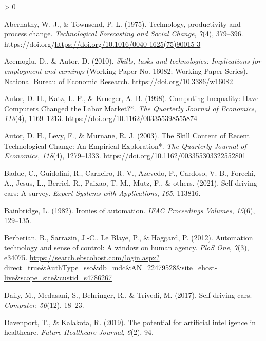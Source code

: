 \documentclass[
  english,
  man]{apa7}
\newlength{\cslhangindent}
\newenvironment{CSLReferences}[2] %
 {%
  \setlength{\parindent}{0pt}
  \ifodd #1 \everypar{\setlength{\hangindent}{\cslhangindent}}\ignorespaces\fi
  \ifnum #2 > 0
  \setlength{\parskip}{#2\baselineskip}
  \fi
 }%
 {}
\begin{document}
\hypertarget{refs}{}
\begin{CSLReferences}{1}{0}
\leavevmode\hypertarget{ref-ABERNATHY1975379}{}%
Abernathy, W. J., \& Townsend, P. L. (1975). Technology, productivity and process change. \emph{Technological Forecasting and Social Change}, \emph{7}(4), 379--396. https://doi.org/\url{https://doi.org/10.1016/0040-1625(75)90015-3}

\leavevmode\hypertarget{ref-NBERw16082}{}%
Acemoglu, D., \& Autor, D. (2010). \emph{Skills, tasks and technologies: Implications for employment and earnings} (Working Paper No. 16082; Working Paper Series). National Bureau of Economic Research. \url{https://doi.org/10.3386/w16082}

\leavevmode\hypertarget{ref-10.1162ux2f003355398555874}{}%
Autor, D. H., Katz, L. F., \& Krueger, A. B. (1998). {Computing Inequality: Have Computers Changed the Labor Market?*}. \emph{The Quarterly Journal of Economics}, \emph{113}(4), 1169--1213. \url{https://doi.org/10.1162/003355398555874}

\leavevmode\hypertarget{ref-10.1162ux2f003355303322552801}{}%
Autor, D. H., Levy, F., \& Murnane, R. J. (2003). {The Skill Content of Recent Technological Change: An Empirical Exploration*}. \emph{The Quarterly Journal of Economics}, \emph{118}(4), 1279--1333. \url{https://doi.org/10.1162/003355303322552801}

\leavevmode\hypertarget{ref-badue2021self}{}%
Badue, C., Guidolini, R., Carneiro, R. V., Azevedo, P., Cardoso, V. B., Forechi, A., Jesus, L., Berriel, R., Paixao, T. M., Mutz, F., \& others. (2021). Self-driving cars: A survey. \emph{Expert Systems with Applications}, \emph{165}, 113816.

\leavevmode\hypertarget{ref-bainbridge1982ironies}{}%
Bainbridge, L. (1982). Ironies of automation. \emph{IFAC Proceedings Volumes}, \emph{15}(6), 129--135.

\leavevmode\hypertarget{ref-2247952820120101}{}%
Berberian, B., Sarrazin, J.-C., Le Blaye, P., \& Haggard, P. (2012). Automation technology and sense of control: A window on human agency. \emph{PloS One}, \emph{7}(3), e34075. \url{https://search.ebscohost.com/login.aspx?direct=true\&AuthType=sso\&db=mdc\&AN=22479528\&site=ehost-live\&scope=site\&custid=s4786267}

\leavevmode\hypertarget{ref-daily2017self}{}%
Daily, M., Medasani, S., Behringer, R., \& Trivedi, M. (2017). Self-driving cars. \emph{Computer}, \emph{50}(12), 18--23.

\leavevmode\hypertarget{ref-davenport2019potential}{}%
Davenport, T., \& Kalakota, R. (2019). The potential for artificial intelligence in healthcare. \emph{Future Healthcare Journal}, \emph{6}(2), 94.


\end{CSLReferences}
\end{document}
